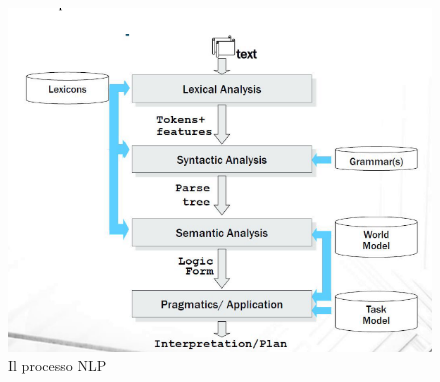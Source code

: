 \begin{figure}[hbt!]
    \centering
    \includegraphics[width=1\textwidth]{img/processo_nlp.png}
    \caption{Il processo NLP}
    \label{fig:processo_nlp}
\end{figure}